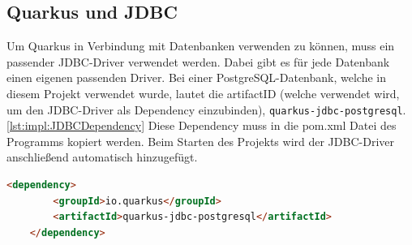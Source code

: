 \subsection{Quarkus und JDBC}
Um Quarkus in Verbindung mit Datenbanken verwenden zu können, muss ein passender JDBC-Driver verwendet werden. Dabei gibt es für jede Datenbank einen eigenen passenden Driver. Bei einer PostgreSQL-Datenbank, welche in diesem Projekt verwendet wurde, lautet die artifactID (welche verwendet wird, um den JDBC-Driver als Dependency einzubinden), \texttt{quarkus-jdbc-postgresql}. \ref{lst:impl:JDBCDependency} Diese Dependency muss in die pom.xml Datei des Programms kopiert werden. Beim Starten des Projekts wird der JDBC-Driver anschließend automatisch hinzugefügt. \cite{quarkusHibernate}


\begin{lstlisting}[language=html,caption=JDBC Dependency,label=lst:impl:JDBCDependency]
    <dependency>
        <groupId>io.quarkus</groupId>
        <artifactId>quarkus-jdbc-postgresql</artifactId>
    </dependency>
  \end{lstlisting}

